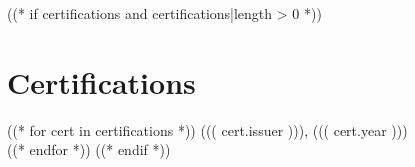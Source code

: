 \documentclass[11pt,a4paper]{article}
\begin{document}
((* if certifications and certifications|length > 0 *))
\section{Certifications}
((* for cert in certifications *))
 \hfill {\small\color{muted} ((( cert.issuer ))), ((( cert.year )))}\\[4pt]
((* endfor *))
((* endif *))
\end{document}
